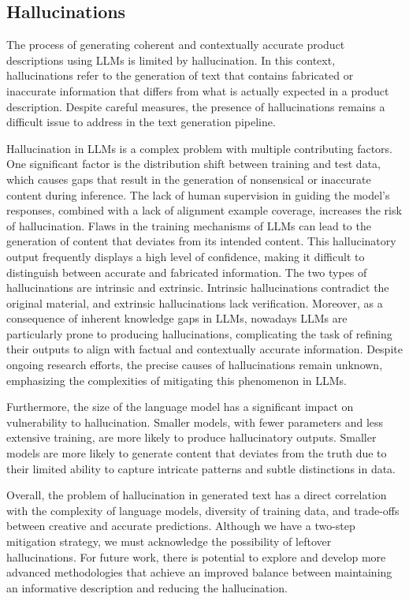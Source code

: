 \subsection{Hallucinations}

The process of generating coherent and contextually accurate product descriptions using LLMs is limited by hallucination. In this context, hallucinations refer to the generation of text that contains fabricated or inaccurate information that differs from what is actually expected in a product description. Despite careful measures, the presence of hallucinations remains a difficult issue to address in the text generation pipeline.

Hallucination in LLMs is a complex problem with multiple contributing factors. One significant factor is the distribution shift between training and test data, which causes gaps that result in the generation of nonsensical or inaccurate content during inference. The lack of human supervision in guiding the model's responses, combined with a lack of alignment example coverage, increases the risk of hallucination. Flaws in the training mechanisms of LLMs can lead to the generation of content that deviates from its intended content. This hallucinatory output frequently displays a high level of confidence, making it difficult to distinguish between accurate and fabricated information. The two types of hallucinations are intrinsic and extrinsic. Intrinsic hallucinations contradict the original material, and extrinsic hallucinations lack verification. Moreover, as a consequence of inherent knowledge gaps in LLMs, nowadays LLMs are particularly prone to producing hallucinations, complicating the task of refining their outputs to align with factual and contextually accurate information. Despite ongoing research efforts, the precise causes of hallucinations remain unknown, emphasizing the complexities of mitigating this phenomenon in LLMs. \cite{Bilan_2023}  \cite{agrawal2023knowledge}

Furthermore, the size of the language model has a significant impact on vulnerability to hallucination. Smaller models, with fewer parameters and less extensive training, are more likely to produce hallucinatory outputs. Smaller models are more likely to generate content that deviates from the truth due to their limited ability to capture intricate patterns and subtle distinctions in data. \cite{Bilan_2023}  \cite{agrawal2023knowledge}

Overall, the problem of hallucination in generated text has a direct correlation with the complexity of language models, diversity of training data, and trade-offs between creative and accurate predictions. Although we have a two-step mitigation strategy, we must acknowledge the possibility of leftover hallucinations. For future work, there is potential to explore and develop more advanced methodologies that achieve an improved balance between maintaining an informative description and reducing the hallucination.

